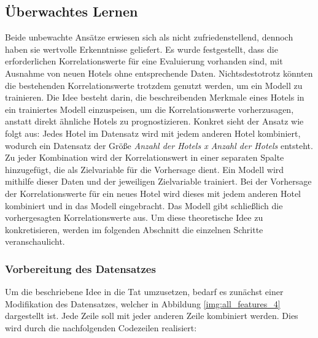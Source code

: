 \subsection{Überwachtes Lernen}
\label{subsec:lean}
Beide unbewachte Ansätze erwiesen sich als nicht zufriedenstellend, dennoch haben sie wertvolle Erkenntnisse geliefert. Es wurde festgestellt, dass die erforderlichen Korrelationswerte für eine Evaluierung vorhanden sind, mit Ausnahme von neuen Hotels ohne entsprechende Daten. Nichtsdestotrotz könnten die bestehenden Korrelationswerte trotzdem genutzt werden, um ein Modell zu trainieren. Die Idee besteht darin, die beschreibenden Merkmale eines Hotels in ein trainiertes Modell einzuspeisen, um die Korrelationswerte vorherzusagen, anstatt direkt ähnliche Hotels zu prognostizieren.
\newline
\newline
Konkret sieht der Ansatz wie folgt aus: Jedes Hotel im Datensatz wird mit jedem anderen Hotel kombiniert, wodurch ein Datensatz der Größe \emph{Anzahl der Hotels x Anzahl der Hotels} entsteht. Zu jeder Kombination wird der Korrelationswert in einer separaten Spalte hinzugefügt, die als Zielvariable für die Vorhersage dient. Ein Modell wird mithilfe dieser Daten und der jeweiligen Zielvariable trainiert. Bei der Vorhersage der Korrelationswerte für ein neues Hotel wird dieses mit jedem anderen Hotel kombiniert und in das Modell eingebracht. Das Modell gibt schließlich die vorhergesagten Korrelationswerte aus.
\newline
\newline
Um diese theoretische Idee zu konkretisieren, werden im folgenden Abschnitt die einzelnen Schritte veranschaulicht.

\subsubsection{Vorbereitung des Datensatzes}
\label{subsubsec:learn_prepare}
Um die beschriebene Idee in die Tat umzusetzen, bedarf es zunächst einer Modifikation des Datensatzes, welcher in Abbildung \ref{img:all_features_4} dargestellt ist. Jede Zeile soll mit jeder anderen Zeile kombiniert werden. Dies wird durch die nachfolgenden Codezeilen realisiert:

